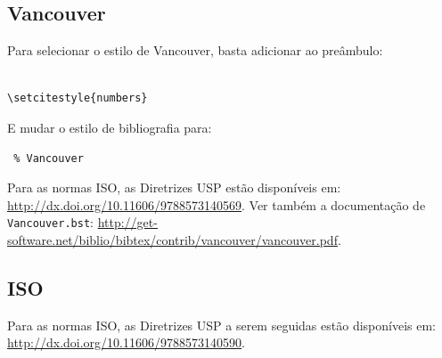 \documentclass[rec]{fearp}
\begin{document}
\subsection{Vancouver}
Para selecionar o estilo de Vancouver, basta adicionar ao preâmbulo: 
\begin{verbatim}

\setcitestyle{numbers}
\end{verbatim}
E mudar o estilo de bibliografia para:
\begin{verbatim}
 % Vancouver
\end{verbatim}

Para as normas ISO, as Diretrizes USP estão disponíveis em: \url{http://dx.doi.org/10.11606/9788573140569}.
Ver também a documentação de \texttt{Vancouver.bst}: \url{http://get-software.net/biblio/bibtex/contrib/vancouver/vancouver.pdf}.

\subsection{ISO}

Para as normas ISO, as Diretrizes USP a serem seguidas estão disponíveis em: \url{http://dx.doi.org/10.11606/9788573140590}.
\end{document}
